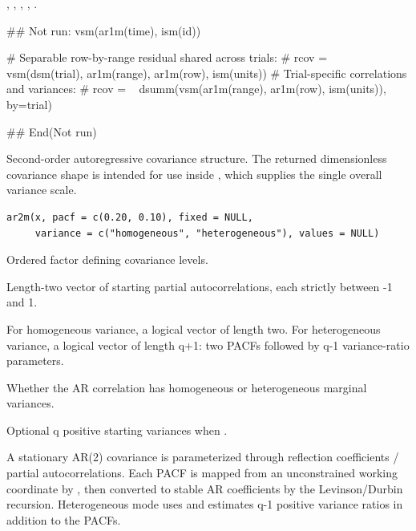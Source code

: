 \documentclass[a4paper]{book}
\begin{document}
%
\begin{SeeAlso}\relax
{}, , , ,
.
\end{SeeAlso}
%
\begin{Examples}
\begin{ExampleCode}
## Not run: 
vsm(ar1m(time), ism(id))

# Separable row-by-range residual shared across trials:
# rcov = ~ vsm(dsm(trial), ar1m(range), ar1m(row), ism(units))
# Trial-specific correlations and variances:
# rcov = ~ dsumm(vsm(ar1m(range), ar1m(row), ism(units)), by=trial)

## End(Not run)
\end{ExampleCode}
\end{Examples}
%
\begin{Description}\relax
Second-order autoregressive covariance structure. The returned dimensionless covariance shape is intended for use inside , which supplies the single overall variance scale.
\end{Description}
%
\begin{Usage}
\begin{verbatim}
ar2m(x, pacf = c(0.20, 0.10), fixed = NULL,
     variance = c("homogeneous", "heterogeneous"), values = NULL)
\end{verbatim}
\end{Usage}
%
\begin{Arguments}
\begin{ldescription}
\item[\code{x}] Ordered factor defining covariance levels.
\item[\code{pacf}] Length-two vector of starting partial autocorrelations, each strictly between -1 and 1.
\item[\code{fixed}] For homogeneous variance, a logical vector of length two. For heterogeneous variance, a logical vector of length q+1: two PACFs followed by q-1 variance-ratio parameters.
\item[\code{variance}] Whether the AR correlation has homogeneous or heterogeneous marginal variances.
\item[\code{values}] Optional q positive starting variances when .
\end{ldescription}
\end{Arguments}
%
\begin{Details}\relax
A stationary AR(2) covariance is parameterized through reflection coefficients / partial autocorrelations. Each PACF is mapped from an unconstrained working coordinate by , then converted to stable AR coefficients by the Levinson/Durbin recursion. Heterogeneous mode uses  and estimates q-1 positive variance ratios in addition to the PACFs.
\end{Details}
\end{document}
